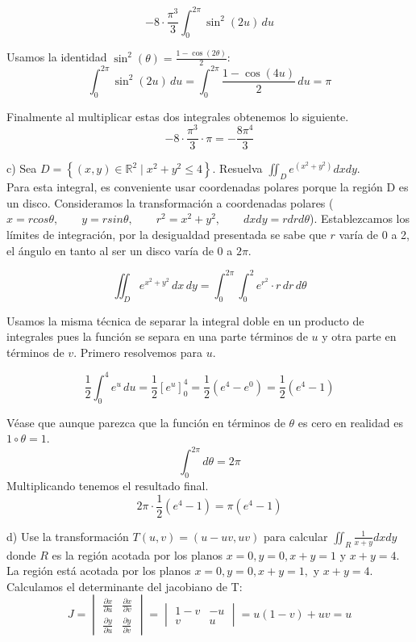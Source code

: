\[
     -8 \cdot \frac{\pi^3}{3} \int_{0}^{2\pi} \sin^2(2u) \, du
     \]


Usamos la identidad \(\sin^2(\theta) = \frac{1 - \cos(2\theta)}{2}\):
\[
     \int_{0}^{2\pi} \sin^2(2u) \, du = \int_{0}^{2\pi} \frac{1 - \cos(4u)}{2} \, du = \pi
     \]

Finalmente al multiplicar estas dos integrales obtenemos lo siguiente.
\[
   -8 \cdot \frac{\pi^3}{3} \cdot \pi = -\frac{8\pi^4}{3}
   \]

c) Sea \( D=\left\{(x, y) \in \mathbb{R}^{2} \mid x^{2}+y^{2} \leq 4\right\} \). Resuelva \( \iint_{D} e^{\left(x^{2}+y^{2}\right)} d x d y \). \\

Para esta integral, es conveniente usar coordenadas polares porque la región D es un disco. Consideramos la transformación a coordenadas polares ($x=rcos\theta, \qquad y=rsin\theta, \qquad r^2 = x^2+y^2, \qquad dxdy=rdrd\theta$). Establezcamos los límites de integración, por la desigualdad presentada se sabe que $r$ varía de 0 a 2, el ángulo en tanto al ser un disco varía de 0 a $2\pi$.

\[
   \iint_{D} e^{x^2 + y^2} \, dx \, dy = \int_{0}^{2\pi} \int_{0}^{2} e^{r^2} \cdot r \, dr \, d\theta
   \]

Usamos la misma técnica de separar la integral doble en un producto de integrales pues la función se separa en una parte términos de $u$ y otra parte en términos de $v$. Primero resolvemos para $u$.

\[
     \frac{1}{2} \int_{0}^{4} e^u \, du = \frac{1}{2} \left[ e^u \right]_{0}^{4} = \frac{1}{2} (e^4 - e^0) = \frac{1}{2} (e^4 - 1)
     \]

Véase que aunque parezca que la función en términos de $\theta$ es cero en realidad es $1\circ\theta=1$.
\[
     \int_{0}^{2\pi} d\theta = 2\pi
     \]
Multiplicando tenemos el resultado final.
\[
   2\pi \cdot \frac{1}{2} (e^4 - 1) = \pi (e^4 - 1)
   \]

d) Use la transformación \( T(u, v)=(u-u v, u v) \) para calcular \( \iint_{R} \frac{1}{x+y} d x d y \) donde \( R \) es la región acotada por los planos \( x=0, y=0, x+y=1 \) y \( x+y=4 \). \\

La región está acotada por los planos $x=0, y=0, x+y=1, \text{ y  } x+y=4$. Calculamos el determinante del jacobiano de T:
\[
   J = \begin{vmatrix}
   \frac{\partial x}{\partial u} & \frac{\partial x}{\partial v} \\
   \frac{\partial y}{\partial u} & \frac{\partial y}{\partial v}
   \end{vmatrix}
   = \begin{vmatrix}
   1 - v & -u \\
   v & u
   \end{vmatrix}
   = u(1-v) + uv = u
   \]


